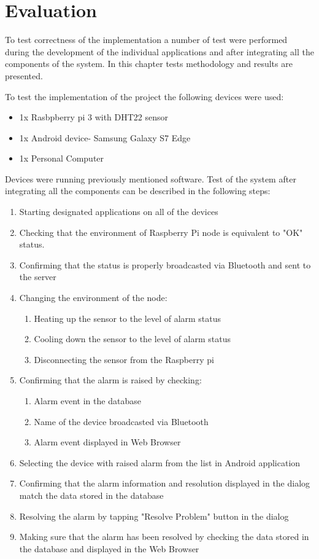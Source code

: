\chapter{Evaluation}
\label{cha:evaluation}

To test correctness of the implementation a number of test were performed during the development of the individual applications and after integrating all the components of the system. In this chapter  tests methodology and results are presented.

To test the implementation of the project the following devices were used:

\begin{itemize}
\item 1x Rasbpberry pi 3 with DHT22 sensor 
\item 1x Android device- Samsung Galaxy S7 Edge
\item 1x Personal Computer
\end{itemize}

Devices were running previously mentioned software. Test of the system after integrating all the components can be described in the following steps:

\begin{enumerate}
\item Starting designated applications on all of the devices
\item Checking that the environment of Raspberry Pi node is equivalent to "OK" status.
\item Confirming that the status is properly broadcasted via Bluetooth and sent to the server
\item Changing the environment of the node:
	\begin{enumerate}
	\item Heating up the sensor to the level of alarm status
	\item Cooling down the sensor to the level of alarm status
	\item Disconnecting the sensor from the Raspberry pi
	\end{enumerate}
\item Confirming that the alarm is raised by checking:
 \begin{enumerate}
	\item Alarm event in the database
	\item Name of the device broadcasted via Bluetooth
	\item Alarm event displayed in Web Browser
	\end{enumerate}
\item Selecting the device with raised alarm from the list in Android application  
\item Confirming that the alarm information and resolution displayed in the dialog match the data stored in the database
\item Resolving the alarm by tapping "Resolve Problem" button in the dialog
\item Making sure that the alarm has been resolved by checking the data stored in the database and displayed in the Web Browser
\end{enumerate}


